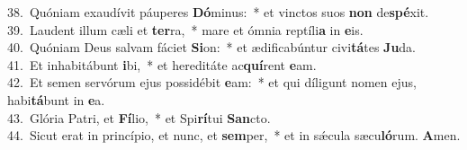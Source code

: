 {38.~}Quóniam exaudívit páuperes \textbf{Dó}minus:~* et vinctos suos \textbf{non} de\textbf{spé}xit.\\
{39.~}Laudent illum cæli et \textbf{ter}ra,~* mare et ómnia reptíli\textbf{a} in \textbf{e}is.\\
{40.~}Quóniam Deus salvam fáciet \textbf{Si}on:~* et ædificabúntur civi\textbf{tá}tes \textbf{Ju}da.\\
{41.~}Et inhabitábunt \textbf{i}bi,~* et hereditáte ac\textbf{quí}rent \textbf{e}am.\\
{42.~}Et semen servórum ejus possidébit \textbf{e}am:~* et qui díligunt nomen ejus, habi\textbf{tá}bunt in \textbf{e}a.\\
{43.~}Glória Patri, et \textbf{Fí}lio,~* et Spi\textbf{rí}tui \textbf{San}cto.\\
{44.~}Sicut erat in princípio, et nunc, et \textbf{sem}per,~* et in sǽcula sæcu\textbf{ló}rum. \textbf{A}men.\\
